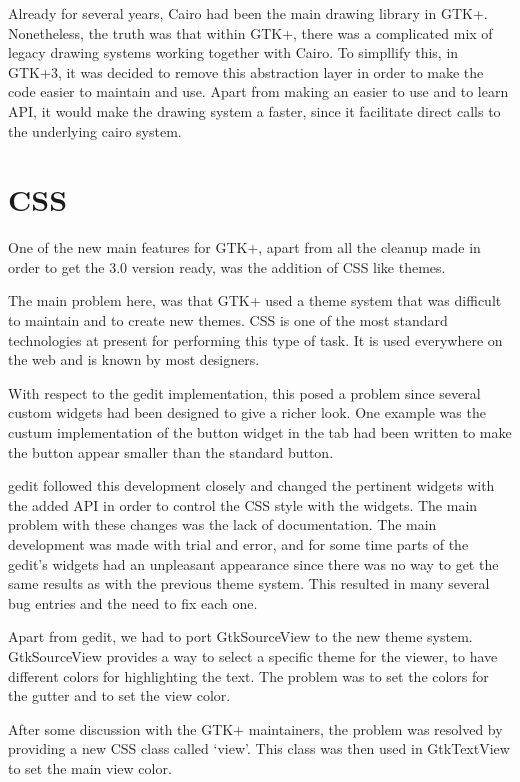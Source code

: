 Already for several years, Cairo had been the main drawing library in GTK+.  Nonetheless, the truth was that 
within GTK+, there was a complicated mix of legacy drawing systems working together with Cairo. 
To simpllify this, in GTK+3, it was decided to remove this abstraction layer in order 
to make the code easier to maintain and use.  Apart from making an easier to use and to learn API, 
it would make the drawing system a faster, since it facilitate direct calls to the underlying cairo system.

\section{CSS}

One of the new main features for GTK+, apart from all the cleanup made in order to get the 3.0 version ready, was the 
addition of CSS like themes.

The main problem here, was that GTK+ used a theme system that was difficult to maintain and to create new themes. CSS is one of the 
most standard technologies at present for performing this type of task. It is used everywhere on the web and is known by most designers. 

With respect to the gedit implementation, this posed a problem since several custom widgets had been designed to give a 
richer look.  One example was the custum implementation of the button widget in the tab had been written to make the button appear 
smaller than the standard button.

gedit followed this development closely and changed the pertinent widgets with the added API in order to control the 
CSS style with the widgets. The main problem with these changes was the lack of documentation. The main development was made with trial 
and error,  and for some time parts of the gedit's widgets had an unpleasant appearance since there was no way to get the same results 
as with the previous theme system. This resulted in many several bug entries and the need to fix each one.

Apart from gedit, we had to port GtkSourceView to the new theme system. GtkSourceView provides a way to select a specific theme for the viewer, to have different colors for highlighting the text. The problem  was to set the colors for the gutter and to set the view color.

After some discussion with the GTK+ maintainers, the problem was resolved by providing a new CSS class called `view'. 
This class was then used in GtkTextView to set the main view color.


